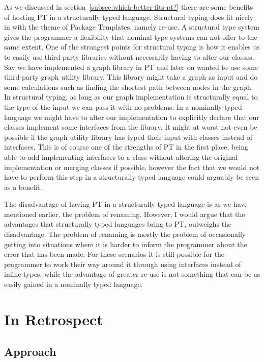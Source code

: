 As we discussed in section~\vref{subsec:which-better-fits-pt?} there are some benefits of hosting PT in a structurally typed language.
Structural typing does fit nicely in with the theme of Package Templates, namely re-use.
A structural type system gives the programmer a flexibility that nominal type systems can not offer to the same extent.
One of the strongest points for structural typing is how it enables us to easily use third-party libraries without necessarily having to alter our classes.
Say we have implemented a graph library in PT and later on wanted to use some third-party graph utility library.
This library might take a graph as input and do some calculations such as finding the shortest path between nodes in the graph.
In structural typing, as long as our graph implementation is structurally equal to the type of the input we can pass it with no problems.
In a nominally typed language we might have to alter our implementation to explicitly declare that our classes implement some interfaces from the library.
It might at worst not even be possible if the graph utility library has typed their input with classes instead of interfaces.
This is of course one of the strengths of PT in the first place, being able to add implementing interfaces to a class without altering the original implementation or merging classes if possible, however the fact that we would not have to perform this step in a structurally typed language could arguably be seen as a benefit.

The disadvantage of having PT in a structurally typed language is as we have mentioned earlier, the problem of renaming.
However, I would argue that the advantages that structurally typed languages bring to PT, outweighs the disadvantage.
The problem of renaming is mostly the problem of occasionally getting into situations where it is harder to inform the programmer about the error that has been made.
For these scenarios it is still possible for the programmer to work their way around it through using interfaces instead of inline-types, while the advantage of greater re-use is not something that can be as easily gained in a nominally typed language.

\section{In Retrospect}\label{sec:in-retrospect}

\subsection{Approach}\label{subsec:result-approach}

